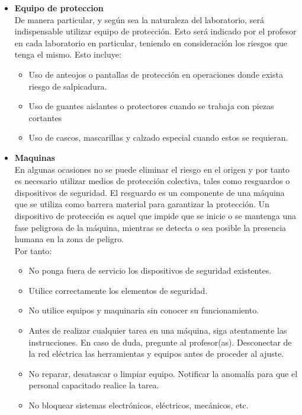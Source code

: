 \documentclass{report}
\begin{document}
\begin{itemize}
\item \textbf{Equipo de proteccion}\\
De manera particular, y según sea la naturaleza del laboratorio, será indispensable
utilizar equipo de protección.
Esto será indicado por el profesor en cada laboratorio en particular, teniendo en
consideración los riesgos que tenga el mismo.
Esto incluye:
\begin{itemize}
\item Uso de anteojos o pantallas de protección en operaciones donde exista
riesgo de salpicadura.
\item Uso de guantes aislantes o protectores cuando se trabaja con piezas
cortantes
\item Uso de cascos, mascarillas y calzado especial cuando estos se
requieran.
\end{itemize}
\item \textbf{Maquinas}\\
En algunas ocasiones no se puede eliminar el riesgo en el origen y por tanto es
necesario utilizar medios de protección colectiva, tales como resguardos o
dispositivos de seguridad.
El resguardo es un componente de una máquina que se utiliza como barrera
material para garantizar la protección.
Un dispositivo de protección es aquel que impide que se inicie o se mantenga una
fase peligrosa de la máquina, mientras se detecta o sea posible la presencia
humana en la zona de peligro.\\
Por tanto:
\begin{itemize}
\item No ponga fuera de servicio los dispositivos de seguridad existentes.
\item Utilice correctamente los elementos de seguridad.
\item No utilice equipos y maquinaria sin conocer su funcionamiento.
\item Antes de realizar cualquier tarea en una máquina, siga atentamente
las instrucciones. En caso de duda, pregunte al profesor(as).
Desconectar de la red eléctrica las herramientas y equipos antes de
proceder al ajuste.
\item No reparar, desatascar o limpiar equipo. Notificar la anomalía para
que el personal capacitado realice la tarea.
\item No bloquear sistemas electrónicos, eléctricos, mecánicos, etc.
\end{itemize}
\end{itemize}







\end{document}
